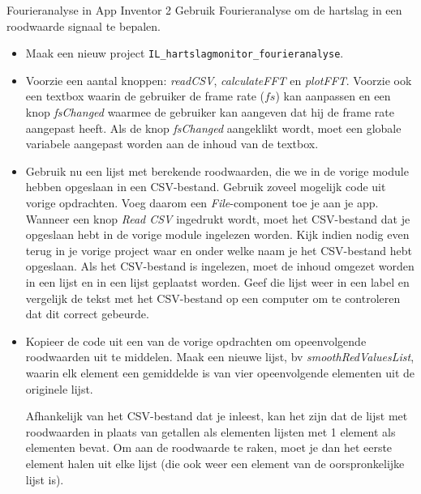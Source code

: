 \begin{opdracht}{Fourieranalyse in App Inventor 2}
Gebruik Fourieranalyse om de hartslag in een roodwaarde signaal te bepalen.
	
\begin{itemize}
	
	\item Maak een nieuw project \texttt{IL\_hartslagmonitor\_fourieranalyse}.
	
	\item Voorzie een aantal knoppen: \emph{readCSV}, \emph{calculateFFT} en \emph{plotFFT}. Voorzie ook een textbox waarin de gebruiker de frame rate ($fs$) kan aanpassen en een knop \emph{fsChanged} waarmee de gebruiker kan aangeven dat hij de frame rate aangepast heeft. Als de knop \emph{fsChanged} aangeklikt wordt, moet een globale variabele aangepast worden aan de inhoud van de textbox.
	
	\item Gebruik nu een lijst met berekende roodwaarden, die we in de vorige module hebben opgeslaan in een CSV-bestand. Gebruik zoveel mogelijk code uit vorige opdrachten. Voeg daarom een \emph{File}-component toe je aan je app. Wanneer een knop \emph{Read CSV} ingedrukt wordt, moet het CSV-bestand dat je opgeslaan hebt in de vorige module ingelezen worden. Kijk indien nodig even terug in je vorige project waar en onder welke naam je het CSV-bestand hebt opgeslaan. Als het CSV-bestand is ingelezen, moet de inhoud omgezet worden in een lijst en in een lijst geplaatst worden. Geef die lijst weer in een label en vergelijk de tekst met het CSV-bestand op een computer om te controleren dat dit correct gebeurde. 
	
	\item Kopieer de code uit een van de vorige opdrachten om opeenvolgende roodwaarden uit te middelen. Maak een nieuwe lijst, bv \emph{smoothRedValuesList}, waarin elk element een gemiddelde is van vier opeenvolgende elementen uit de originele lijst. 
	
	\begin{opmerking}
		Afhankelijk van het CSV-bestand dat je inleest, kan het zijn dat de lijst met roodwaarden in plaats van getallen als elementen lijsten met 1 element als elementen bevat. Om aan de roodwaarde te raken, moet je dan het eerste element halen uit elke lijst (die ook weer een element van de oorspronkelijke lijst is).
		
	\end{opmerking}
	

\end{itemize}
\end{opdracht}
